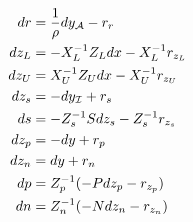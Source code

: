 \documentclass[10pt]{article}
\begin{document}
	
	\begin{equation}
		\begin{aligned}
		dr &= \frac{1}{\rho} dy_{\mathcal A} - r_r\\
		dz_L &= -X_L^{-1}Z_L dx - X_L^{-1} r_{z_L}\\
		dz_U &= X_U^{-1}Z_U dx - X_U^{-1} r_{z_U}\\
		dz_s &= -dy_{\mathcal I} + r_s\\
		ds &= -Z_s^{-1}S dz_s - Z_s^{-1} r_{z_s}\\ 
		dz_p &= -dy + r_p \\
		dz_n &= dy + r_n \\
		dp &= Z_p^{-1}(-P dz_p - r_{z_p}) \\
		dn &= Z_n^{-1}(-N dz_n - r_{z_n}) \notag
		\end{aligned}
	\end{equation}
	
	
\end{document}
